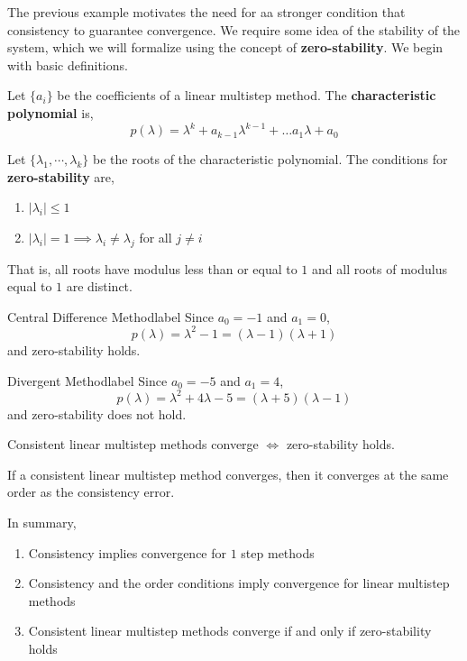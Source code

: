 \NewLine

The previous example motivates the need for aa stronger condition that consistency to guarantee convergence. We require some idea of the stability of the system, which we will formalize using the concept of \textbf{zero-stability}. We begin with basic definitions.

\NewLine

\begin{defn}
	Let $\{a_i\}$ be the coefficients of a linear multistep method. The \textbf{characteristic polynomial} is,
	\[p(\lambda)=\lambda^k+a_{k-1} \lambda^{k-1}+\ldots a_1 \lambda+a_0\]
\end{defn}

\begin{defn}
	Let $\{\lambda_1, \cdots, \lambda_k\}$ be the roots of the characteristic polynomial. The conditions for \textbf{zero-stability} are,
	\begin{enumerate}
		\item $|\lambda_i| \leq 1$
		\item $|\lambda_i| = 1 \implies \lambda_i \neq \lambda_j$ for all $j \neq i$
	\end{enumerate}
	That is, all roots have modulus less than or equal to $1$ and all roots of modulus equal to $1$ are distinct.
\end{defn}

\begin{ex}{Central Difference Method}{label}
	Since $a_0 = -1$ and $a_1 = 0$,
	\[p(\lambda)=\lambda^2-1=(\lambda-1)(\lambda+1)\]
	and zero-stability holds.
\end{ex}

\begin{ex}{Divergent Method}{label}
	Since $a_0 = -5$ and $a_1 = 4$,
	\[p(\lambda)=\lambda^2+4\lambda-5=(\lambda+5)(\lambda-1)\]
	and zero-stability does not hold.
\end{ex}

\begin{thm}
	Consistent linear multistep methods converge $\iff$ zero-stability holds.
\end{thm}

\begin{cor}
	If a consistent linear multistep method converges, then it converges at the same order as the consistency error.
\end{cor}

\begin{marginfigure}
	In summary,
	\begin{enumerate}
		\item Consistency implies convergence for $1$ step methods
		\item Consistency and the order conditions imply convergence for linear multistep methods
		\item Consistent linear multistep methods converge if and only if zero-stability holds
	\end{enumerate}
\end{marginfigure}

